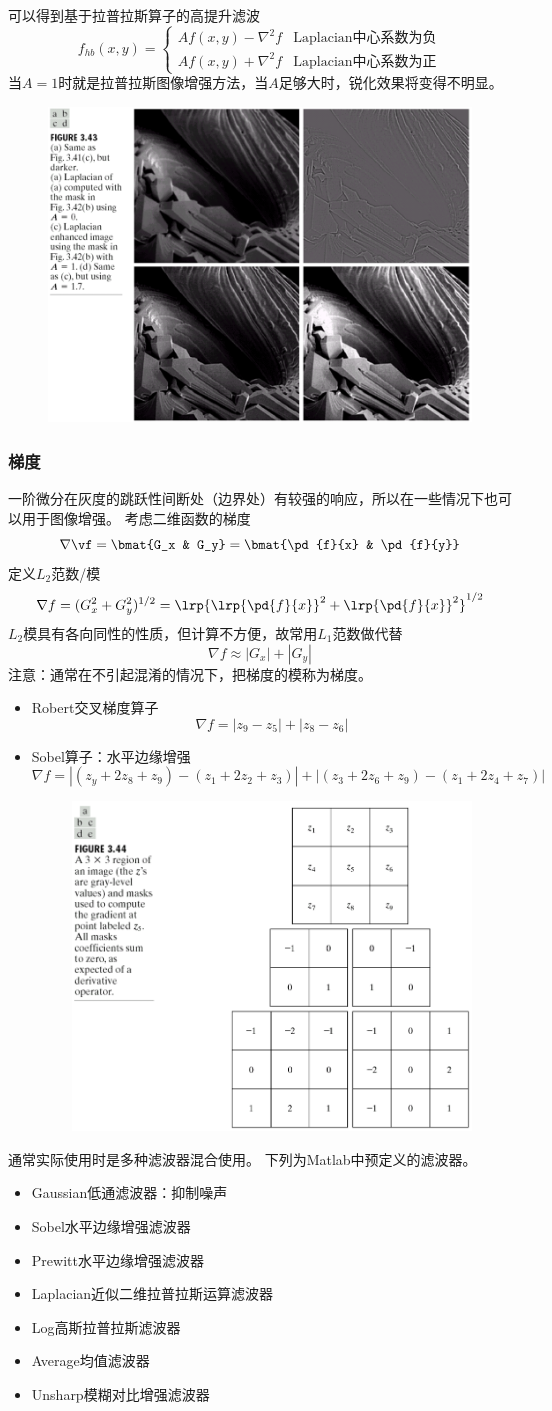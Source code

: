 可以得到基于拉普拉斯算子的高提升滤波
\[f_{hb}(x,y)=
\begin{cases}
Af(x,y)-\nabla^2 f & \text{Laplacian中心系数为负}\\
Af(x,y)+\nabla^2 f & \text{Laplacian中心系数为正}
\end{cases}\]
当$A=1$时就是拉普拉斯图像增强方法，当$A$足够大时，锐化效果将变得不明显。
\begin{figure}[H]
\centering
\includegraphics[width=0.6\linewidth]{fig/high-boost.png}
\end{figure}

\subsubsection{梯度}
一阶微分在灰度的跳跃性间断处（边界处）有较强的响应，所以在一些情况下也可以用于图像增强。
考虑二维函数的梯度
\[\nabla\vf=\bmat{G_x & G_y}=\bmat{\pd{f}{x} & \pd{f}{y}}\]
定义$L_2$范数/模
\[\nabla f=(G_x^2+G_y^2)^{1/2}=\lrp{\lrp{\pd{f}{x}}^2+\lrp{\pd{f}{x}}^2}^{1/2}\]
$L_2$模具有各向同性的性质，但计算不方便，故常用$L_1$范数做代替
\[\nabla f\approx |G_x|+|G_y|\]
注意：通常在不引起混淆的情况下，把梯度的模称为梯度。
\begin{itemize}
\item Robert交叉梯度算子
\[\nabla f=|z_9-z_5|+|z_8-z_6|\]
\item Sobel算子：水平边缘增强
\[\nabla f=|(z_y+2z_8+z_9)-(z_1+2z_2+z_3)|+|(z_3+2z_6+z_9)-(z_1+2z_4+z_7)|\]
\begin{figure}[H]
\centering
\includegraphics[width=0.6\linewidth]{fig/sobel_and_robert.png}
\end{figure}
\end{itemize}

通常实际使用时是多种滤波器混合使用。
下列为Matlab中预定义的滤波器。
\begin{itemize}
\item Gaussian低通滤波器：抑制噪声
\item Sobel水平边缘增强滤波器
\item Prewitt水平边缘增强滤波器
\item Laplacian近似二维拉普拉斯运算滤波器
\item Log高斯拉普拉斯滤波器
\item Average均值滤波器
\item Unsharp模糊对比增强滤波器
\end{itemize}